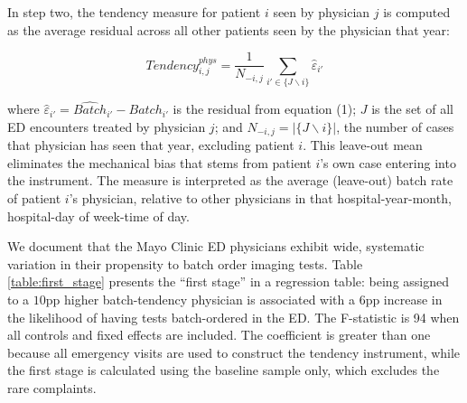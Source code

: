 \documentclass[,mnsc,nonblindrev]{informs}
\begin{document}
In step two, the tendency measure for patient \(i\) seen by physician
\(j\) is computed as the average residual across all other patients seen
by the physician that year:

\begin{equation}
Tendency_{i,j}^{phys} =
\frac{1}{N_{-i,j}} \sum_{i' \in \{J \backslash i\}}\hat{\varepsilon}_{i'}
\end{equation}

where \(\hat{\varepsilon}_{i'} = \hat{Batch}_{i'} - Batch_{i'}\) is the
residual from equation (1); \(J\) is the set of all ED encounters
treated by physician \(j\); and \(N_{-i,j} = |\{J \backslash i\}|\), the
number of cases that physician has seen that year, excluding patient
\(i\). This leave-out mean eliminates the mechanical bias that stems
from patient \(i\)'s own case entering into the instrument. The measure
is interpreted as the average (leave-out) batch rate of patient \(i\)'s
physician, relative to other physicians in that hospital-year-month,
hospital-day of week-time of day.

We document that the Mayo Clinic ED physicians exhibit wide, systematic
variation in their propensity to batch order imaging tests. Table
\ref{table:first_stage} presents the ``first stage'' in a regression
table: being assigned to a \(10\)pp higher batch-tendency physician is
associated with a \(6\)pp increase in the likelihood of having tests
batch-ordered in the ED. The F-statistic is 94 when all controls and
fixed effects are included. The coefficient is greater than one because
all emergency visits are used to construct the tendency instrument,
while the first stage is calculated using the baseline sample only,
which excludes the rare complaints.
\end{document}
